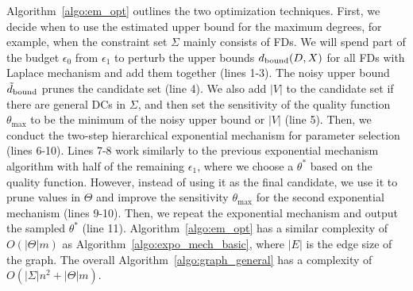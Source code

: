 Algorithm~\ref{algo:em_opt} outlines the two optimization techniques. First, we decide when to use the estimated upper bound for the maximum degrees, for example, when the constraint set $\Sigma$ mainly consists of FDs. We will spend part of the budget $\epsilon_0$ from $\epsilon_1$ to perturb the upper bounds $d_{\normalfont{\text{bound}}}(D,X)$ for all FDs with Laplace mechanism and add them together (lines 1-3). The noisy upper bound $\tilde{d}_{\normalfont{\text{bound}}}$ prunes the candidate set (line 4). We also add $|V|$ to the candidate set if there are general DCs in $\Sigma$, and then set the sensitivity of the quality function $\theta_{\max}$ to be the minimum of the noisy upper bound or $|V|$ (line 5).
Then, we conduct the two-step hierarchical exponential mechanism for parameter selection (lines 6-10). Lines 7-8 work similarly to the previous exponential mechanism algorithm with half of the remaining $\epsilon_1$, where we choose a $\theta^*$ based on the quality function. However, instead of using it as the final candidate, we use it to prune values in $\Theta$ and improve the sensitivity $\theta_{\max}$ for the second exponential mechanism (lines 9-10). Then, we repeat the exponential mechanism and output the sampled $\theta^*$ (line 11).
Algorithm~\ref{algo:em_opt} has a similar complexity of $O(|\Theta|m)$ as Algorithm~\ref{algo:expo_mech_basic}, where $|E|$ is the edge size of the graph. The overall Algorithm~\ref{algo:graph_general} has a complexity of $O(|\Sigma|n^2+|\Theta|m)$.




